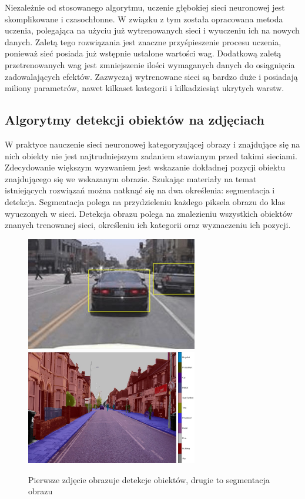 Niezależnie od stosowanego algorytmu, uczenie głębokiej sieci neuronowej jest skomplikowane i czasochłonne.
W związku z tym została opracowana metoda uczenia, polegająca na użyciu już wytrenowanych sieci i wyuczeniu
ich na nowych danych. Zaletą tego rozwiązania jest znaczne przyśpieszenie procesu uczenia, ponieważ sieć posiada już wstępnie 
ustalone wartości wag. Dodatkową zaletą przetrenowanych wag jest zmniejszenie ilości wymaganych danych do osiągnięcia zadowalających efektów. 
Zazwyczaj wytrenowane sieci są bardzo duże i posiadają miliony parametrów, nawet kilkaset kategorii i kilkadziesiąt ukrytych warstw.

\subsection{Algorytmy detekcji obiektów na zdjęciach}
W praktyce nauczenie sieci neuronowej kategoryzującej obrazy i znajdujące się na nich obiekty nie jest najtrudniejszym zadaniem stawianym 
przed takimi sieciami. Zdecydowanie większym wyzwaniem jest wskazanie dokładnej pozycji obiektu znajdującego się we wskazanym obrazie.
Szukając materiały na temat istniejących rozwiązań można natknąć się na dwa określenia: segmentacja i detekcja. 
Segmentacja polega na przydzieleniu każdego piksela obrazu do klas wyuczonych w sieci. 
Detekcja obrazu polega na znalezieniu wszystkich obiektów znanych trenowanej sieci, określeniu ich kategorii oraz wyznaczeniu 
ich pozycji.
\begin{figure}[H]
	\centering
	\includegraphics[width=7.5cm]{pages/teoria/zdjecia/ObjectDetectionUsingYOLOV4DeepLearningExample_01.jpg}
	\includegraphics[width=7.5cm]{pages/teoria/zdjecia/SemanticSegmentationUsingDeepLearningExample_03.jpg}
	\caption{Pierwsze zdjęcie obrazuje detekcje obiektów, drugie to segmentacja obrazu\cite{matlabDetekcjaPrzyklad}}
	\label{rys:detekcjaVsSegemntacja}
\end{figure}

